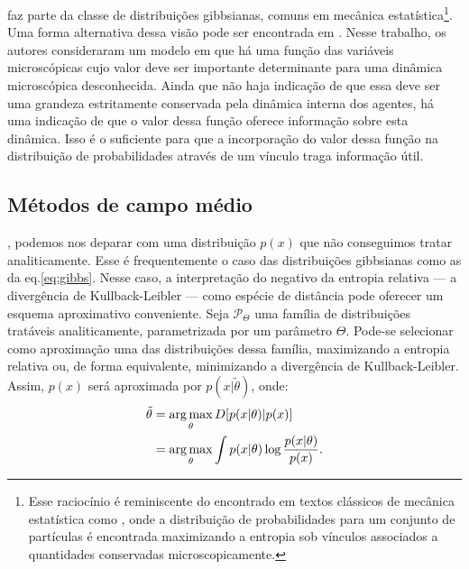  faz parte da classe de distribuições gibbsianas, comuns em mecânica estatística\footnote[][-5cm]{Esse raciocínio é reminiscente do encontrado em textos clássicos de mecânica estatística como \citet{Landau1980}, onde a distribuição de probabilidades para um conjunto de partículas é encontrada maximizando a entropia sob vínculos associados a quantidades conservadas microscopicamente.}\cite{Landau1980}. Uma forma alternativa dessa visão pode ser encontrada\cite{NCaticha2011} em \citet{NCaticha2011}. Nesse trabalho, os autores consideraram um modelo em que há uma função das variáveis microscópicas cujo valor deve ser importante determinante para uma dinâmica microscópica desconhecida. Ainda que não haja indicação de que essa deve ser uma grandeza estritamente conservada pela dinâmica interna dos agentes, há uma indicação de que o valor dessa função oferece informação sobre esta dinâmica. Isso é o suficiente para que a incorporação do valor dessa função na distribuição de probabilidades através de um vínculo traga informação útil. 

\subsection{Métodos de campo médio}
\label{sec:meanfield}
, podemos nos deparar com uma distribuição $p(x)$ que não conseguimos tratar analiticamente. Esse é frequentemente o caso das distribuições gibbsianas como as da eq.\eqref{eq:gibbs}. Nesse caso, a interpretação do negativo da entropia relativa --- a divergência de Kullback-Leibler --- como espécie de distância pode oferecer um esquema aproximativo conveniente. Seja $\mathcal{P}_\Theta$ uma família de distribuições tratáveis analiticamente, parametrizada por um parâmetro $\Theta$. Pode-se selecionar como aproximação uma das distribuições dessa família, maximizando a entropia relativa ou, de forma equivalente, minimizando a divergência de Kullback-Leibler. Assim, $p(x)$ será aproximada por $p(x | \tilde{\theta})$, onde:
\begin{align}
\tilde{\theta} &= \operatorname*{arg\,max}_{\theta} D[ p(x|\theta)|p(x) ] \nonumber \\ &= \operatorname*{arg\,max}_{\theta} \int p(x|\theta) \log\frac{p(x|\theta)}{p(x)}.\nonumber
\end{align}


